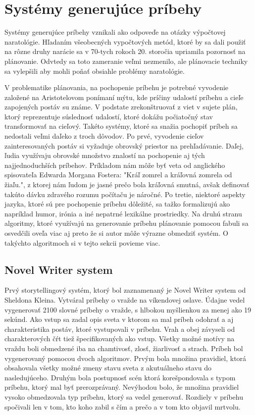 \section{Systémy generujúce príbehy}
Systémy generujúce príbehy vznikali ako odpoveďe na otázky výpočtovej naratológie. Hľadaním všeobecných vypočtových metód, ktoré by sa dali použiť na rôzne druhy narácie sa v 70-tych rokoch 20. storočia upriamila pozornosť na plánovanie. Odvtedy sa toto zameranie veľmi nezmenilo, ale plánovacie techniky sa vylepšili aby mohli poňať obsiahle problémy naratológie.\par
V problematike plánovania, na pochopenie príbehu je potrebné vyvodenie založené na Aristotelovom ponímaní mýtu, kde príčiny udalostí príbehu a cieľe zapojených postáv su známe. V podstate zrekonštruovať z viet v sujete plán, ktorý reprezentuje súslednosť udalostí, ktoré dokážu počiatočný stav transformovať na cieľový. Takéto systémy, ktoré sa snažia pochopiť príbeh sa nedostali veľmi daľeko z troch dôvodov. Po prvé, vyvodenie cieľov zainteresovaných postáv si vyžaduje obrovský priestor na prehľadávanie. Daľej, ľudia využívaju obrovské množstvo znalostí na pochopenie aj tých najjednoduchších príbehov. Príkladom nám môže byť veta od anglického spisovateľa Edwarda Morgana Fostera: "Kráľ zomrel a kráľovná zomrela od žiaľu.", z ktorej nám ľudom je jasné prečo bola kráľovná smutná, avšak definovať takúto dávku zdravého rozumu počítaču je náročné. Po tretie, niektoré aspekty jazyka, ktoré sú pre pochopenie príbehu dôležité, sa tažko formalizujú ako napríklad humor, irónia a iné nepatrné lexikálne prostriedky. Na druhú stranu algoritmy, ktoré využívajú na generovanie príbehu plánovanie pomocou fabuli sa osvedčili oveľa viac aj preto že si autor môže výrazne obmedziť systém. O takýchto algoritmoch si v tejto sekcii povieme viac.\par
\subsection{Novel Writer system}
Prvý storytellingový systém, ktorý bol zaznamenaný je Novel Writer system od Sheldona Kleina. Vytváral príbehy o vražde na víkendovej oslave. Údajne vedel vygenerovať 2100 slovné príbehy o vražde, s hlbokou myšlienkou za menej ako 19 sekúnd. Ako vstup sa zadal opis sveta v ktorom sa mal príbeh odohrať a aj charakteristika postáv, ktoré vystupovali v príbehu. Vrah a obej závyseli od charakterových čŕt tiež špecifikovaných ako vstup. Všetky možné motívy na vraždu boli obmedzené iba na chamtivosť, zlosť, žiarlivosť a strach. Príbeh bol vygenerovaný pomocou dvoch algoritmov. Prvým bola množina pravidiel, ktorá obsahovala všetky možné zmeny stavu sveta z akutuálneho stavu do nasledujúceho. Druhým bola postupnosť scén ktorá korešpondovala s typom príbehu, ktorý mal byť prerozprávaný. Nevýhodou bolo, že množina pravidiel vysoko obmedzovala typ príbehu, ktorý sa vedel generovať. Rozdiely v príbehu spočivali len v tom, kto koho zabil s čím a prečo a v tom kto objavil mrtvolu. \par
